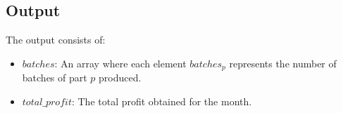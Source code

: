 \documentclass{article}
\begin{document}
\subsection*{Output}

The output consists of:
\begin{itemize}
    \item $batches$: An array where each element $batches_{p}$ represents the number of batches of part $p$ produced.
    \item $total\_profit$: The total profit obtained for the month.
\end{itemize}
\end{document}
